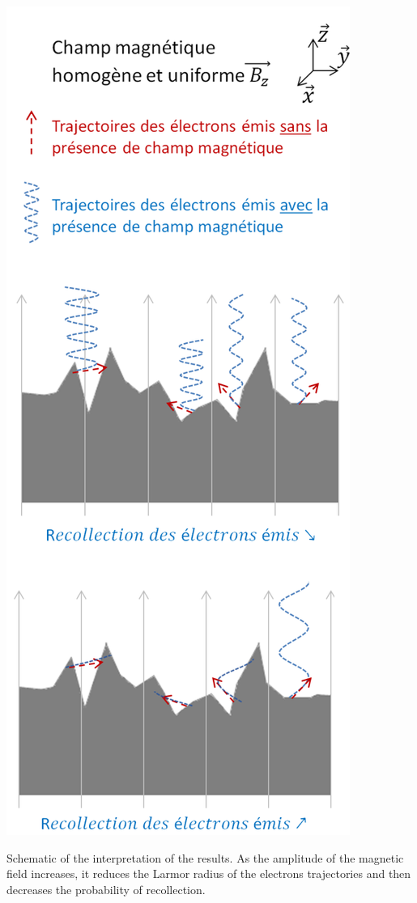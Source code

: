 \begin{marginfigure}
	\centering
	\includegraphics[width=1.0\linewidth]{figures/chap4/electron_trajectory}
	\caption{Schematic of the interpretation of the results. As the amplitude of the magnetic field increases, it reduces the Larmor radius of the electrons trajectories and then decreases the probability of recollection.}
	\label{fig:electrontrajectory}
\end{marginfigure}

